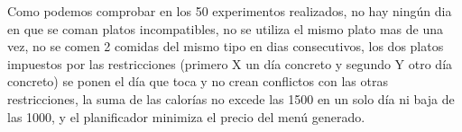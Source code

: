 Como podemos comprobar en los 50 experimentos realizados, no hay ningún dia en que se coman platos incompatibles, no se utiliza el mismo plato mas de una vez, no se comen 2 comidas del mismo tipo en dias consecutivos, los dos platos impuestos por las restricciones (primero X un día concreto y segundo Y otro día concreto) se ponen el día que toca y no crean conflictos con las otras restricciones, la suma de las calorías no excede las 1500 en un solo día ni baja de las 1000, y el planificador minimiza el precio del menú generado.
